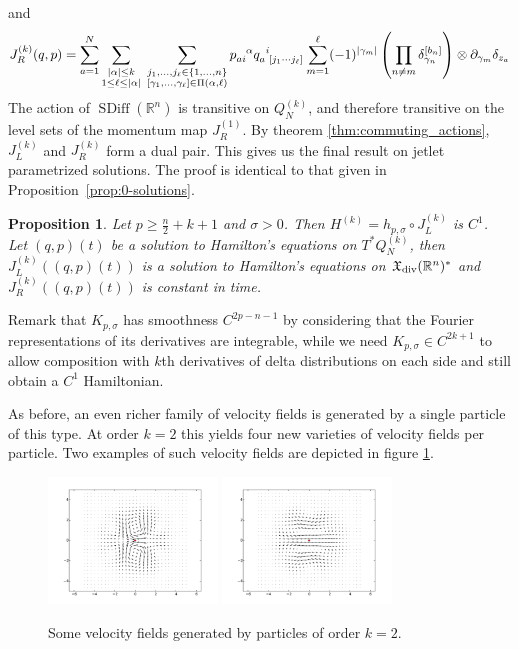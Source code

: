 \documentclass[12pt]{amsart}
\newcommand{\R}{\ensuremath{\mathbb{R}}}
\newtheorem{prop}[thm]{Proposition}
\DeclareMathOperator{\SDiff}{SDiff}
\begin{document}
  and
  \begin{equation*}
    J_R^{(k)}(q,p) = \sum_{a=1}^{N}
    \sum_{\substack{ |\alpha| \leq k \\ 1 \leq \ell \leq |\alpha| }} \;
		\sum_{
			\substack{
				j_1,\dots,j_\ell \in \{1,\dots,n\} \\
				[\gamma_1,\dots,\gamma_\ell] \in \Pi(\alpha,\ell)
				}
			}
			p\indices{_a_i^\alpha} q\indices{_a^i_{[j_1 \cdots j_\ell]}}
      \sum_{m=1}^\ell (-1)^{|\gamma_m|}\left( \prod_{n \neq m}  \delta_{\gamma_n}^{[b_n]} \right) \otimes \partial_{\gamma_m}\delta_{z_a}
  \end{equation*}
  The action of $\SDiff(\R^n)$ is transitive on $Q_N^{(k)}$, and
  therefore transitive on the level sets of the momentum map $J_R^{(1)}$.
  By theorem \ref{thm:commuting_actions}, $J_L^{(k)}$ and $J_R^{(k)}$ form a dual pair.
  This gives us the final result on jetlet parametrized solutions.
  The proof is identical to that given in Proposition~\ref{prop:0-solutions}.
  \begin{prop}\label{prop:k-solutions}
    Let $p \ge \frac{n}{2} + k + 1$ and $\sigma > 0$.
    Then $H^{(k)} = h_{p,\sigma} \circ J_L^{(k)}$ is $C^1$.
    Let $(q,p)(t)$ be a solution to Hamilton's equations on
    $T^*Q^{(k)}_N$, then $J_L^{(k)}( (q,p)(t))$ is a solution to Hamilton's
    equations on $\mathfrak{X}_{\rm div}(\R^n)^*$
    and $J_R^{(k)}( (q,p)(t))$ is constant in time.
  \end{prop}
  Remark that $K_{p,\sigma}$ has smoothness $C^{2p-n-1}$ by considering
  that the Fourier representations of its derivatives are integrable,
  while we need $K_{p,\sigma} \in C^{2k+1}$ to allow composition with
  $k$th derivatives of delta distributions on each side and still
  obtain a $C^1$ Hamiltonian.

  As before, an even richer family of velocity fields is generated by a single particle of this type.
  At order $k=2$ this yields four new varieties of velocity fields per particle.
  Two examples of such velocity fields are depicted in figure \ref{fig:2_jet}.
  
  \begin{figure}[h!]
  	\centering
	\includegraphics[width=0.4\textwidth]{two_jet_a_2D.pdf}
	\includegraphics[width=0.4\textwidth]{two_jet_b_2D.pdf}
	\caption{Some velocity fields generated by particles of order $k=2$.}
	\label{fig:2_jet}
  \end{figure}
  
\end{document}
